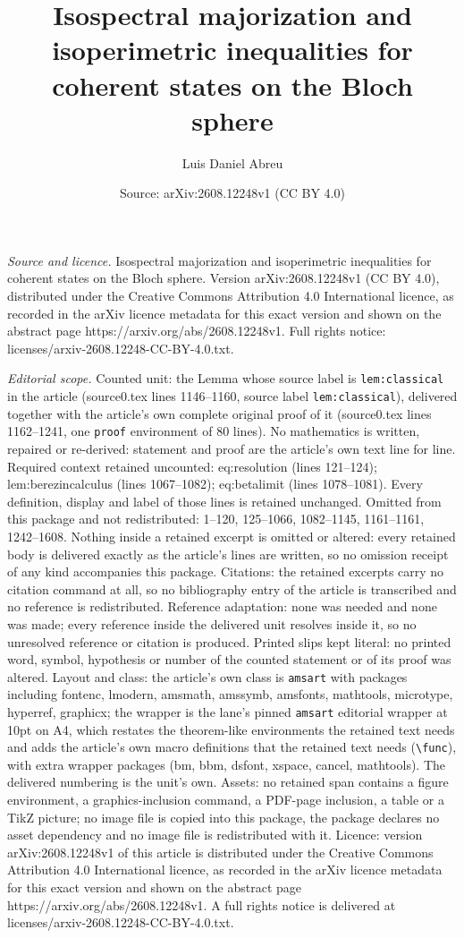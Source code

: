 \documentclass[10pt,a4paper]{amsart}
\title[Isospectral majorization and isoperimetric inequalities for ]{Isospectral majorization and isoperimetric inequalities for coherent states on the Bloch sphere}
\author{Luis Daniel Abreu}
\date{Source: arXiv:2608.12248v1 (CC BY 4.0)}
\begin{document}
\maketitle

\noindent\emph{Source and licence.} Isospectral majorization and isoperimetric inequalities for coherent states on the Bloch sphere. Version arXiv:2608.12248v1 (CC BY 4.0), distributed under the Creative Commons Attribution 4.0 International licence, as recorded in the arXiv licence metadata for this exact version and shown on the abstract page https://arxiv.org/abs/2608.12248v1. Full rights notice: licenses/arxiv-2608.12248-CC-BY-4.0.txt.\par\smallskip

\noindent\textit{Editorial scope.} Counted unit: the Lemma whose source label is \texttt{lem:classical} in the article (source0.tex lines 1146--1160, source label \texttt{lem:classical}), delivered together with the article's own complete original proof of it (source0.tex lines 1162--1241, one \texttt{proof} environment of 80 lines). No mathematics is written, repaired or re-derived: statement and proof are the article's own text line for line. Required context retained uncounted: eq:resolution (lines 121--124); lem:berezincalculus (lines 1067--1082); eq:betalimit (lines 1078--1081). Every definition, display and label of those lines is retained unchanged. Omitted from this package and not redistributed: 1--120, 125--1066, 1082--1145, 1161--1161, 1242--1608. Nothing inside a retained excerpt is omitted or altered: every retained body is delivered exactly as the article's lines are written, so no omission receipt of any kind accompanies this package. Citations: the retained excerpts carry no citation command at all, so no bibliography entry of the article is transcribed and no reference is redistributed. Reference adaptation: none was needed and none was made; every reference inside the delivered unit resolves inside it, so no unresolved reference or citation is produced. Printed slips kept literal: no printed word, symbol, hypothesis or number of the counted statement or of its proof was altered. Layout and class: the article's own class is \texttt{amsart} with packages including fontenc, lmodern, amsmath, amssymb, amsfonts, mathtools, microtype, hyperref, graphicx; the wrapper is the lane's pinned \texttt{amsart} editorial wrapper at 10pt on A4, which restates the theorem-like environments the retained text needs and adds the article's own macro definitions that the retained text needs (\texttt{\textbackslash func}), with extra wrapper packages (bm, bbm, dsfont, xspace, cancel, mathtools). The delivered numbering is the unit's own. Assets: no retained span contains a figure environment, a graphics-inclusion command, a PDF-page inclusion, a table or a TikZ picture; no image file is copied into this package, the package declares no asset dependency and no image file is redistributed with it. Licence: version arXiv:2608.12248v1 of this article is distributed under the Creative Commons Attribution 4.0 International licence, as recorded in the arXiv licence metadata for this exact version and shown on the abstract page https://arxiv.org/abs/2608.12248v1. A full rights notice is delivered at licenses/arxiv-2608.12248-CC-BY-4.0.txt. 
\end{document}
